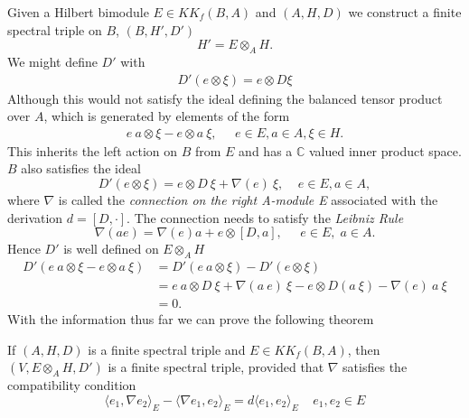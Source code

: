 Given a Hilbert bimodule $E \in KK_f(B, A)$ and $(A, H, D)$ we construct
a finite spectral triple on $B$, $(B, H', D')$
\begin{equation}
    H' = E \otimes _A H.
\end{equation}
We might define $D'$ with
\begin{align}
    D'(e \otimes \xi) = e\otimes D\xi
\end{align}
Although this would not satisfy the ideal defining the balanced tensor
product over $A$, which is generated by elements of the form
\begin{align}
    e\ a \otimes \xi - e\otimes a\ \xi, \;\;\;\;\; e\in E, a\in A, \xi \in
    H.
\end{align}
This inherits the left action on $B$ from $E$ and has a $\mathbb{C}$
valued inner product space. $B$ also satisfies the ideal
\begin{equation}
    D'(e\otimes \xi) = e \otimes D\ \xi + \nabla (e)\ \xi, \;\;\;\; e\in
    E, a\in A,
\end{equation}
where $\nabla$ is called the \textit{connection on the right A-module E}
associated with the  derivation $d=[D, \cdot]$. The connection needs to
satisfy the \textit{Leibniz Rule}
\begin{equation}
    \nabla(ae) = \nabla(e)a + e \otimes [D, a], \;\;\;\;\;  e\in E,\; a\in A.
\end{equation}
Hence $D'$ is well defined on $E \otimes _A H$
\begin{align}
    D'(e\ a \otimes \xi - e \otimes a\ \xi) &=  D'(e\ a \otimes \xi) - D'(e
    \otimes \xi) \nonumber\\
    &= e\ a\otimes D\ \xi + \nabla(a\ e)\ \xi - e \otimes D(a\ \xi) - \nabla
    (e)\ a\ \xi \nonumber\\
    &= 0.
\end{align}
With the information thus far we can prove the following theorem
\begin{mytheorem}
    If $(A, H, D)$ is a finite spectral triple and $E \in KK_f(B, A)$,
    then $(V, E\otimes _A H, D')$ is a finite spectral triple, provided that
    $\nabla$ satisfies the compatibility condition
    \begin{equation}
        \langle e_1, \nabla e_2 \rangle _E - \langle \nabla e_1, e_2
        \rangle _E = d\langle e_1, e_2 \rangle _E \;\;\;\; e_1, e_2 \in E
    \end{equation}
\end{mytheorem}
